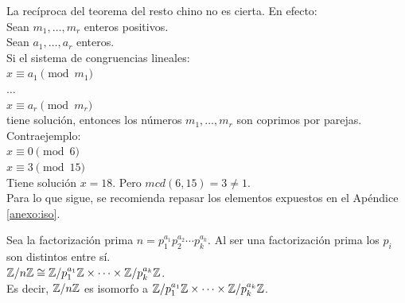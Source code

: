 La recíproca del teorema del resto chino no es cierta. En efecto:\\
Sean $m_{1}, \ldots, m_{r}$ enteros positivos.\\
Sean $a_1, \ldots, a_r$ enteros.\\
Si el sistema de congruencias lineales: \\
$x \equiv a_{1} \pmod {m_{1}}$ \\
$\ldots$ \\
$x \equiv a_{r} \pmod {m_{r}}$ \\
tiene solución, entonces los números $m_{1}, \ldots, m_{r}$ son coprimos por parejas.\\
Contraejemplo:\\
$x \equiv 0 \pmod 6$\\
$x \equiv 3 \pmod {15}$\\
Tiene solución $x=18$. Pero $mcd(6,15)=3 \neq 1$. \\

Para lo que sigue, se recomienda repasar los elementos expuestos en el Apéndice \ref{anexo:iso}.

\begin{enunciado} \label{enun:teorRestoChinoIso}\leavevmode\par
Sea la factorización prima $n = p_1^{a_1} p_2^{a_2} \cdots p_k^{a_k}$. Al ser una factorización prima los $p_i$ son distintos entre sí. \\
$\mathbb{Z}/n\mathbb{Z} \cong \mathbb{Z}/p_1^{a_1}\mathbb{Z} \times \dots \times \mathbb{Z}/p_k^{a_k}\mathbb{Z}$. \\
Es decir, $\mathbb{Z}/n\mathbb{Z}$ es isomorfo a $\mathbb{Z}/p_1^{a_1}\mathbb{Z} \times \dots \times \mathbb{Z}/p_k^{a_k}\mathbb{Z}$.
\end{enunciado}

